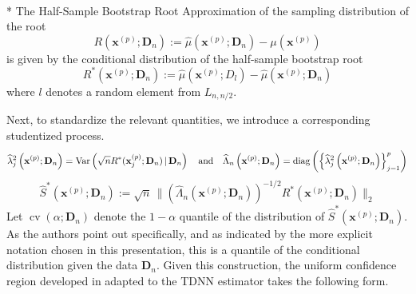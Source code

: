 \begin{boxD}
	\begin{dfn}\mbox{}\\*
		The Half-Sample Bootstrap Root Approximation of the sampling distribution of the root
		\begin{equation}
			R\left(\mathbf{x}^{(p)}; \mathbf{D}_n\right)
			:= \hat{\mu}\left(\mathbf{x}^{(p)}; \mathbf{D}_n\right) - \mu(\mathbf{x}^{(p)})
		\end{equation}
		is given by the conditional distribution of the half-sample bootstrap root
		\begin{equation}
			R^{*}\left(\mathbf{x}^{(p)}; \mathbf{D}_n\right)
			:= \hat{\mu}\left(\mathbf{x}^{(p)}; D_l\right) - \hat{\mu}\left(\mathbf{x}^{(p)}; \mathbf{D}_n\right)
		\end{equation}
		where $l$ denotes a random element from $L_{n, n/2}$.
	\end{dfn}
\end{boxD}

Next, to standardize the relevant quantities, we introduce a corresponding studentized process.
\begin{equation}
	\widehat{\lambda}_{j}^{2}\left(\mathbf{x}^{(p)}; \mathbf{D}_n\right) = \text{Var}\left(\sqrt{n} R^{*}(\mathbf{x}^{(p)}_{j}; \mathbf{D}_n) \, | \, \mathbf{D}_n\right)
	\quad \text{and} \quad
	\widehat{\Lambda}_n\left(\mathbf{x}^{(p)}; \mathbf{D}_n\right) = \operatorname{diag}\left(\left\{\widehat{\lambda}_{j}^{2}\left(\mathbf{x}^{(p)}; \mathbf{D}_n\right)\right\}_{j = 1}^{p}\right)
\end{equation}
\begin{equation}
	\hat{S}^{*}\left(\mathbf{x}^{(p)}; \mathbf{D}_n\right)
	:= \sqrt{n} \, \Big\| \left(\hat{\Lambda}_n\left(\mathbf{x}^{(p)}; \mathbf{D}_n\right)\right)^{-1/2} R^{*}\left(\mathbf{x}^{(p)}; \mathbf{D}_n\right)\Big\|_{2}
\end{equation}
Let $\operatorname{cv}\left(\alpha; \mathbf{D}_n\right)$ denote the $1-\alpha$ quantile of the distribution of $\hat{S}^{*}\left(\mathbf{x}^{(p)}; \mathbf{D}_n\right)$.
As the authors point out specifically, and as indicated by the more explicit notation chosen in this presentation, this is a quantile of the conditional distribution given the data $\mathbf{D}_n$.
Given this construction, the uniform confidence region developed in \citet{ritzwoller_uniform_2024} adapted to the TDNN estimator takes the following form.

